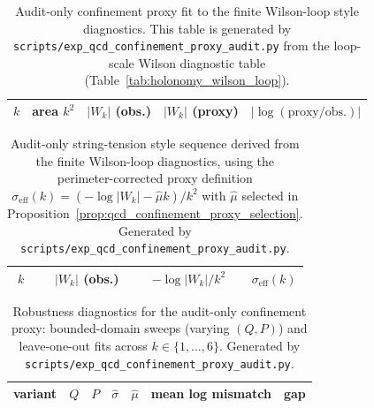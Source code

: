 %

\begin{table}[t]
\centering
\scriptsize
\setlength{\tabcolsep}{8pt}
\renewcommand{\arraystretch}{1.15}
\begin{tabular}{rrrrr}
\toprule
$k$ & area $k^2$ & $|W_k|$ (obs.) & $|W_k|$ (proxy) & $|\log(\mathrm{proxy}/\mathrm{obs.})|$ \\
\midrule
%
\end{tabular}
\caption{Audit-only confinement proxy fit to the finite Wilson-loop style diagnostics. This table is generated by \texttt{scripts/exp\_qcd\_confinement\_proxy\_audit.py} from the loop-scale Wilson diagnostic table (Table~\ref{tab:holonomy_wilson_loop}).}
\label{tab:qcd_confinement_proxy_audit}
\end{table}

%

\begin{table}[t]
\centering
\scriptsize
\setlength{\tabcolsep}{8pt}
\renewcommand{\arraystretch}{1.15}
\begin{tabular}{rrrr}
\toprule
$k$ & $|W_k|$ (obs.) & $-\log|W_k|/k^2$ & $\sigma_{\mathrm{eff}}(k)$ \\
\midrule
%
\end{tabular}
\caption{Audit-only string-tension style sequence derived from the finite Wilson-loop diagnostics, using the perimeter-corrected proxy definition $\sigma_{\mathrm{eff}}(k)=(-\log|W_k|-\widehat\mu k)/k^2$ with $\widehat\mu$ selected in Proposition~\ref{prop:qcd_confinement_proxy_selection}. Generated by \texttt{scripts/exp\_qcd\_confinement\_proxy\_audit.py}.}
\label{tab:qcd_confinement_proxy_sigma}
\end{table}

\begin{table}[t]
\centering
\scriptsize
\setlength{\tabcolsep}{8pt}
\renewcommand{\arraystretch}{1.15}
\begin{tabular}{lrrrrrr}
\toprule
variant & $Q$ & $P$ & $\widehat\sigma$ & $\widehat\mu$ & mean log mismatch & gap \\
\midrule
%
\end{tabular}
\caption{Robustness diagnostics for the audit-only confinement proxy: bounded-domain sweeps (varying $(Q,P)$) and leave-one-out fits across $k\in\{1,\dots,6\}$. Generated by \texttt{scripts/exp\_qcd\_confinement\_proxy\_audit.py}.}
\label{tab:qcd_confinement_proxy_robustness}
\end{table}

